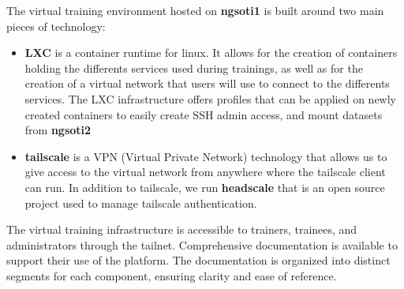 The virtual training environment hosted on {\bf{ngsoti1}} is built around two main pieces of technology:

\begin{itemize}

	\item {\bf{LXC}} is a container runtime for
	linux\cite{linux_containers}. It allows for the
	creation of containers holding the differents services used during
	trainings, as well as for the creation of a virtual network that users will
	use to connect to the differents services. The LXC infrastructure offers
	profiles that can be applied on newly created containers to easily create
	SSH admin access, and mount datasets from {\bf{ngsoti2}}
	
	\item {\bf{tailscale}}\cite{tailscale,} is a VPN
	(Virtual Private Network) technology that allows us to give access to the
	virtual network from anywhere where the tailscale client can run. In
	addition to tailscale, we run
	{\bf{headscale}}\cite{headscale} that is an open
	source project used to manage tailscale authentication.
	
\end{itemize}

The virtual training infrastructure is accessible to trainers, trainees, and
administrators through the tailnet. Comprehensive documentation is available
to support their use of the platform. The documentation is organized into
distinct segments for each component, ensuring clarity and ease of reference.

